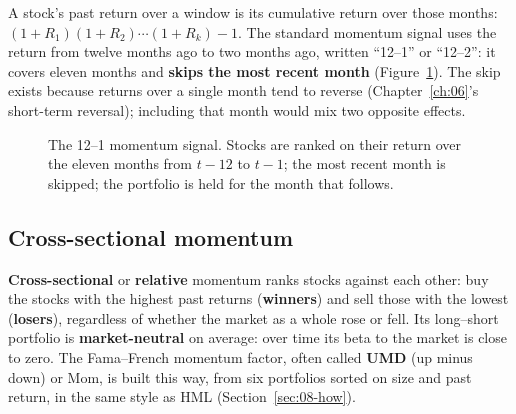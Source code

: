 A stock's past return over a window is its cumulative return over those months: $(1 + R_1)(1 + R_2)\cdots(1 + R_k) - 1$. The standard momentum signal uses the return from twelve months ago to two months ago, written ``12--1'' or ``12--2'': it covers eleven months and \textbf{skips the most recent month} (Figure~\ref{fig:09-signal}). The skip exists because returns over a single month tend to reverse (Chapter~\ref{ch:06}'s short-term reversal); including that month would mix two opposite effects.

\begin{figure}[htbp]
\centering
{}
\caption{The 12--1 momentum signal. Stocks are ranked on their return over the eleven months from $t-12$ to $t-1$; the most recent month is skipped; the portfolio is held for the month that follows.}
\label{fig:09-signal}
\end{figure}

\subsection{Cross-sectional momentum}

\textbf{Cross-sectional} or \textbf{relative} momentum ranks stocks against each other: buy the stocks with the highest past returns (\textbf{winners}) and sell those with the lowest (\textbf{losers}), regardless of whether the market as a whole rose or fell. Its long--short portfolio is \textbf{market-neutral} on average: over time its beta to the market is close to zero. The Fama--French momentum factor, often called \textbf{UMD} (up minus down) or Mom, is built this way, from six portfolios sorted on size and past return, in the same style as HML (Section~\ref{sec:08-how}).

